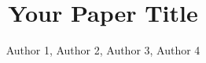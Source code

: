 \documentclass{article}
\title{Your Paper Title}
\author{Author 1, Author 2, Author 3, Author 4}
\begin{document}
\maketitle

\begin{abstract}

\end{abstract}













\end{document}
